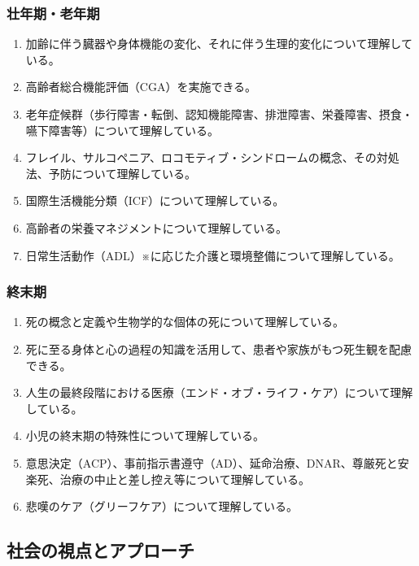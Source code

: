 \hypertarget{ux58eeux5e74ux671fux8001ux5e74ux671f}{%
\subsubsection{壮年期・老年期}\label{ux58eeux5e74ux671fux8001ux5e74ux671f}}

\begin{enumerate}
\def\labelenumi{\arabic{enumi}.}
\tightlist
\item
  加齢に伴う臓器や身体機能の変化、それに伴う生理的変化について理解している。
\item
  高齢者総合機能評価（CGA）を実施できる。
\item
  老年症候群（歩行障害・転倒、認知機能障害、排泄障害、栄養障害、摂食・嚥下障害等）について理解している。
\item
  フレイル、サルコペニア、ロコモティブ・シンドロームの概念、その対処法、予防について理解している。
\item
  国際生活機能分類（ICF）について理解している。
\item
  高齢者の栄養マネジメントについて理解している。
\item
  日常生活動作（ADL）※に応じた介護と環境整備について理解している。
\end{enumerate}

\hypertarget{ux7d42ux672bux671f}{%
\subsubsection{終末期}\label{ux7d42ux672bux671f}}

\begin{enumerate}
\def\labelenumi{\arabic{enumi}.}
\tightlist
\item
  死の概念と定義や生物学的な個体の死について理解している。
\item
  死に至る身体と心の過程の知識を活用して、患者や家族がもつ死生観を配慮できる。
\item
  人生の最終段階における医療（エンド・オブ・ライフ・ケア）について理解している。
\item
  小児の終末期の特殊性について理解している。
\item
  意思決定（ACP）、事前指示書遵守（AD）、延命治療、DNAR、尊厳死と安楽死、治療の中止と差し控え等について理解している。
\item
  悲嘆のケア（グリーフケア）について理解している。
\end{enumerate}

\hypertarget{ux793eux4f1aux306eux8996ux70b9ux3068ux30a2ux30d7ux30edux30fcux30c1}{%
\subsection{社会の視点とアプローチ}\label{ux793eux4f1aux306eux8996ux70b9ux3068ux30a2ux30d7ux30edux30fcux30c1}}


